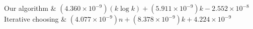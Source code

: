 Our algorithm & \((4.360 \times 10^{-9})(k \log k) + (5.911 \times 10^{-9})k - 2.552 \times 10^{-8}\)\\
Iterative choosing & \((4.077 \times 10^{-9})n + (8.378 \times 10^{-9})k + 4.224 \times 10^{-9}\)\\
